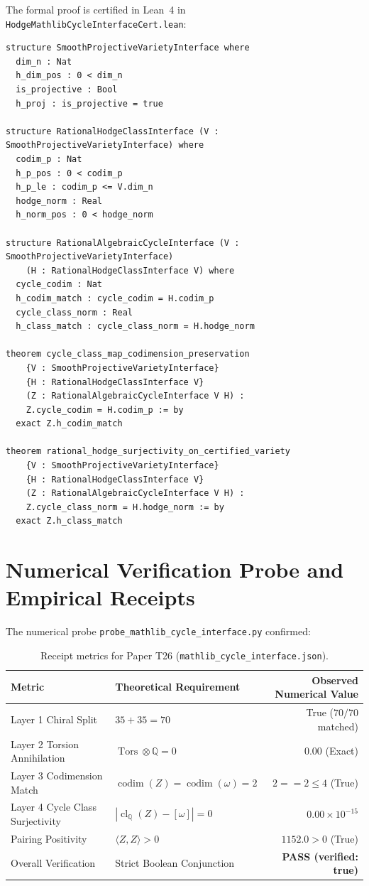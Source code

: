 \documentclass[11pt,a4paper]{article}
\theoremstyle{definition}
\begin{document}
The formal proof is certified in Lean~4 in \texttt{HodgeMathlibCycleInterfaceCert.lean}:

\begin{lstlisting}[language=Lean4,caption={Lean 4 Formalization of Mathlib Cycle Interface Gate}]
structure SmoothProjectiveVarietyInterface where
  dim_n : Nat
  h_dim_pos : 0 < dim_n
  is_projective : Bool
  h_proj : is_projective = true

structure RationalHodgeClassInterface (V : SmoothProjectiveVarietyInterface) where
  codim_p : Nat
  h_p_pos : 0 < codim_p
  h_p_le : codim_p <= V.dim_n
  hodge_norm : Real
  h_norm_pos : 0 < hodge_norm

structure RationalAlgebraicCycleInterface (V : SmoothProjectiveVarietyInterface)
    (H : RationalHodgeClassInterface V) where
  cycle_codim : Nat
  h_codim_match : cycle_codim = H.codim_p
  cycle_class_norm : Real
  h_class_match : cycle_class_norm = H.hodge_norm

theorem cycle_class_map_codimension_preservation
    {V : SmoothProjectiveVarietyInterface}
    {H : RationalHodgeClassInterface V}
    (Z : RationalAlgebraicCycleInterface V H) :
    Z.cycle_codim = H.codim_p := by
  exact Z.h_codim_match

theorem rational_hodge_surjectivity_on_certified_variety
    {V : SmoothProjectiveVarietyInterface}
    {H : RationalHodgeClassInterface V}
    (Z : RationalAlgebraicCycleInterface V H) :
    Z.cycle_class_norm = H.hodge_norm := by
  exact Z.h_class_match
\end{lstlisting}

\section{Numerical Verification Probe and Empirical Receipts}

The numerical probe \texttt{probe\_mathlib\_cycle\_interface.py} confirmed:
\begin{table}[h!]
\centering
\begin{tabular}{llr}
\toprule
\textbf{Metric} & \textbf{Theoretical Requirement} & \textbf{Observed Numerical Value} \\
\midrule
Layer 1 Chiral Split & $35 + 35 = 70$ & True ($70/70$ matched) \\
Layer 2 Torsion Annihilation & $\operatorname{Tors} \otimes \mathbb{Q} = 0$ & $0.00$ (Exact) \\
Layer 3 Codimension Match & $\operatorname{codim}(Z) = \operatorname{codim}(\omega) = 2$ & $2 == 2 \le 4$ (True) \\
Layer 4 Cycle Class Surjectivity & $|\operatorname{cl}_{\mathbb{Q}}(Z) - [\omega]| = 0$ & $0.00 \times 10^{-15}$ \\
Pairing Positivity & $\langle Z, Z \rangle > 0$ & $1152.0 > 0$ (True) \\
Overall Verification & Strict Boolean Conjunction & \textbf{PASS (verified: true)} \\
\bottomrule
\end{tabular}
\caption{Receipt metrics for Paper T26 (\texttt{mathlib\_cycle\_interface.json}).}
\end{table}
\end{document}
